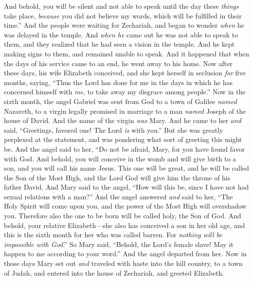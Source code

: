 \begin{biblechapter}
\verse And behold, you will be silent and not able to speak until the day these \textit{things} take place, \textit{because} you did not believe my words, which will be fulfilled in their time.”
\verse And the people were waiting for Zechariah, and began to wonder \textit{when} he was delayed in the temple.
\verse And \textit{when he} came out he was not able to speak to them, and they realized that he had seen a vision in the temple. And he kept making signs to them, and remained unable to speak.
\verse And it happened that when the days of his service came to an end, he went away to his home.
\verse Now after these days, his wife Elizabeth conceived, and she kept herself in seclusion \textit{for} five months, saying,
\verse “Thus the Lord has done for me in the days in which he has concerned himself with \textit{me}, to take away my disgrace among people.”
 Now in the sixth month, the angel Gabriel was sent from God to a town of Galilee \textit{named} Nazareth,
\verse to a virgin legally promised in marriage to a man \textit{named} Joseph of the house of David. And the name of the virgin \textit{was} Mary.
\verse And he came to her \textit{and} said, “Greetings, favored one! The Lord \textit{is} with you.”
\verse But she was greatly perplexed at the statement, and was pondering what sort of greeting this might be.
\verse And the angel said to her,
\verse “Do not be afraid, Mary, for you have found favor with God.
\verse And behold, you will conceive in the womb and will give birth to a son, 
and you will call his name Jesus.
\verse This one will be great, and he will be called the Son of the Most High, 
and the Lord God will give him the throne of his father David.
\verse And Mary said to the angel, “How will this be, since I have not had sexual relations with a man?”
\verse And the angel answered \textit{and} said to her, “The Holy Spirit will come upon you, 
and the power of the Most High will overshadow you. 
Therefore also the one to be born will be called holy, the Son of God.
\verse And behold, your relative Elizabeth—she also has conceived a son in her old age, and this is the sixth month for her who was called barren.
\verse For \textit{nothing will be impossible with God}.”
\verse So Mary said, “Behold, the Lord’s female slave! May it happen to me according to your word.” And the angel departed from her.
 Now in those days Mary set out \textit{and} traveled with haste into the hill country, to a town of Judah,
\verse and entered into the house of Zechariah, and greeted Elizabeth.

\end{biblechapter}
